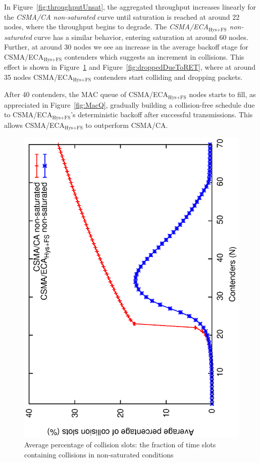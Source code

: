 \documentclass[a4paper,journal]{IEEEtran}
\begin{document}
	In Figure~\ref{fig:throughputUnsat}, the aggregated throughput increases linearly for the \emph{CSMA/CA non-saturated} curve until saturation is reached at around 22 nodes, where the throughput begins to degrade. The \emph{CSMA/ECA$_{\text{Hys+FS}}$ non-saturated} curve has a similar behavior, entering saturation at around 60 nodes. Further, at around 30 nodes we see an increase in the average backoff stage for CSMA/ECA$_{\text{Hys+FS}}$ contenders which suggests an increment in collisions. This effect is shown in Figure~\ref{fig:collisions-unsat} and Figure~\ref{fig:droppedDueToRET}, where at around 35 nodes CSMA/ECA$_{\text{Hys+FS}}$ contenders start colliding and dropping packets. 
	
	After 40 contenders, the MAC queue of CSMA/ECA$_{\text{Hys+FS}}$ nodes starts to fill, as appreciated in Figure~\ref{fig:MacQ}, gradually building a collision-free schedule due to CSMA/ECA$_{\text{Hys+FS}}$'s deterministic backoff after successful transmissions. This allows CSMA/ECA$_{\text{Hys+FS}}$ to outperform CSMA/CA.\\
		
   	\begin{figure}[tb]
		\centering
		\includegraphics[width=0.7\linewidth,angle=-90]{figures/unsaturated/collision-unsaturated/collisions-unsaturated.eps}
		\caption{Average percentage of collision slots: the fraction of time slots containing collisions in non-saturated conditions}
		\label{fig:collisions-unsat}
	\end{figure}	
	
\end{document}
